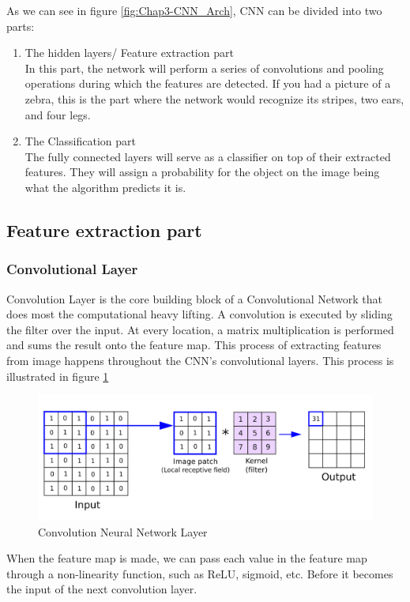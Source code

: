 As we can see in figure \ref{fig:Chap3-CNN_Arch}, CNN can be divided into two parts:
\begin{enumerate}
	\item The hidden layers/ Feature extraction part\\
	In this part, the network will perform a series of convolutions and pooling operations during which the features are detected. If you had a picture of a zebra, this is the part where the network would recognize its stripes, two ears, and four legs.
	\item The Classification part\\
	The fully connected layers will serve as a classifier on top of their extracted features. They will assign a probability for the object on the image being what the algorithm predicts it is.
\end{enumerate}

\subsection{Feature extraction part}
\subsubsection{Convolutional Layer}
Convolution Layer is the core building block of a Convolutional Network that does most
the computational heavy lifting. A convolution is executed by sliding the filter over
the input. At every location, a matrix multiplication is performed and sums the result onto
the feature map. This process of extracting features from image happens throughout the CNN's convolutional
layers. This process is illustrated in figure \ref{fig:Chap3-CNN_Layer}

\begin{figure}[H]
	\centering
	\includegraphics[width=\textwidth]{img/Chap3/ConvLayer}
	\caption{Convolution Neural Network Layer}
	\label{fig:Chap3-CNN_Layer}
\end{figure}
When the feature map is made, we can pass each value in
the feature map through a non-linearity function, such as ReLU, sigmoid, etc. Before it
becomes the input of the next convolution layer.

